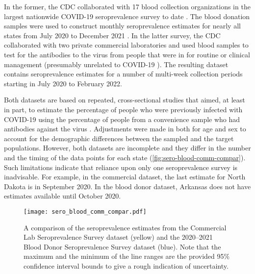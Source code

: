 In the former, the CDC
collaborated with 17 blood collection organizations in the largest nationwide
COVID-19 seroprevalence survey to date \citep{cdc2021blood}. The blood donation
samples were used to construct monthly seroprevalence estimates for nearly all
states from July 2020 to December 2021 \citep{jones2021estimated}. In the latter
survey, the CDC collaborated with two private commercial laboratories and used
blood samples to test for the antibodies to the virus from people that were in
for routine or clinical management (presumably unrelated to COVID-19
\citealp{bajema2021estimated}). The resulting dataset contains seroprevalence
estimates for a number of multi-week collection periods starting in July 2020 to
February 2022. 

Both datasets are based on repeated, cross-sectional studies that aimed, at
least in part, to estimate the percentage of people who were previously infected
with COVID-19 using the percentage of people from a convenience sample who had
antibodies against the virus \citep{bajema2021estimated, cdc2020data,
jones2021estimated}. Adjustments were made in both for age and sex to account
for the demographic differences between the sampled and the target populations.
However, both datasets are incomplete and they differ in the number and the
timing of the data points for each state (\autoref{fig:sero-blood-comm-compar}).
Such limitations indicate that reliance upon only one seroprevalence survey is
inadvisable. For example, in the commercial dataset, the last estimate for North
Dakota is in September 2020. In the blood donor dataset, Arkansas does not have
estimates available until October 2020. 

\begin{figure}[!tb]
\centering
    \texttt{[image: sero\_blood\_comm\_compar.pdf]}
    \caption{A comparison of the seroprevalence estimates from the Commercial
    Lab Seroprevalence Survey dataset (yellow) and the 2020--2021 Blood Donor 
    Seroprevalence Survey dataset (blue). Note that the maximum and the minimum
    of the line ranges are the provided 95\% confidence interval bounds to 
    give a rough indication of uncertainty.}
    \label{fig:sero-blood-comm-compar}
\end{figure}
    
